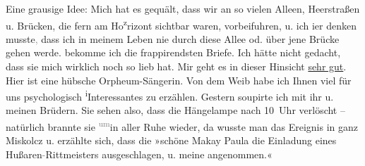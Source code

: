 \begin{ledgroupsized}[t]{13cm}
           Eine grausige Idee: Mich hat es gequält, dass wir an so vielen Alleen, Heerstraßen u.
               Brücken,  die fern am Ho\substVorne{}\textsuperscript{z}\substDazwischen{}r\substHinten{}izont sichtbar waren, vorbeifuhren, u. ich i{\geminationm}er
               denken musste\textcolor{gray}{,} dass ich in meinem Leben nie durch diese Allee od.
               über jene Brücke gehen werde.\pend
           \pstart
           {\pb}\label{K_L03103-1v}\label{K_L03103-1h} bekomme ich die frappirendsten Briefe. Ich hätte nicht gedacht, dass sie mich wirklich
               noch so lieb hat. Mir geht es in dieser Hinsicht \uline{sehr
                  gut}.\pend
           \pstart
           Hier ist eine hübsche Orpheum-Sängerin. Von dem Weib habe ich Ihnen viel für
               uns psychologisch \substVorne{}\textsuperscript{i}\substDazwischen{}I\substHinten{}nteressantes zu erzählen.\pend
           \pstart
           Gestern soupirte ich mit ihr u. meinen Brüdern. Sie sehen also, dass die Hängelampe nach 10 Uhr
               verlöscht – natürlich brannte sie \substVorne{}\textsuperscript{\textcolor{gray}{um}}\substDazwischen{}in\substHinten{} aller Ruhe wieder, {\pb}da wusste man das Ereignis
               in ganz Miskolcz u. erzählte sich, dass die
               »schöne Makay Paula die Einladung eines
                  Hußaren\textcolor{gray}{-}Rittmeisters ausgeschlagen, u. meine angenommen.«\pend
           \pstart

\end{ledgroupsized}
